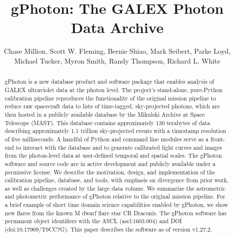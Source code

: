 \documentclass[preprint]{aastex}
\begin{document}
\title{gPhoton: The GALEX Photon Data Archive}

\author{
  Chase Million,
  Scott W. Fleming,
  Bernie Shiao,
  Mark Seibert,
  Parke Loyd,
  Michael Tucker,
  Myron Smith,
  Randy Thompson,
  Richard L. White
}



\begin{abstract}
gPhoton is a new database product and software package that enables analysis of GALEX ultraviolet data at the photon level. The project's stand-alone, pure-Python calibration pipeline reproduces the functionality of the original mission pipeline to reduce raw spacecraft data to lists of time-tagged, sky-projected photons, which are then hosted in a publicly available database by the Mikulski Archive at Space Telescope (MAST). This database contains approximately 130 terabytes of data describing approximately 1.1 trillion sky-projected events with a timestamp resolution of five milliseconds. A handful of Python and command line modules serve as a front-end to interact with the database and to generate calibrated light curves and images from the photon-level data at user-defined temporal and spatial scales. The gPhoton software and source code are in active development and publicly available under a permissive license. We describe the motivation, design, and implementation of the calibration pipeline, database, and tools, with emphasis on divergence from prior work, as well as challenges created by the large data volume. We summarize the astrometric and photometric performance of gPhoton relative to the original mission pipeline. For a brief example of short time domain science capabilities enabled by gPhoton, we show new flares from the known M dwarf flare star CR Draconis. The gPhoton software has permanent object identifiers with the ASCL (ascl:1603.004) and DOI (doi:10.17909/T9CC7G).  This paper describes the software as of version v1.27.2.
\end{abstract}
\end{document}

